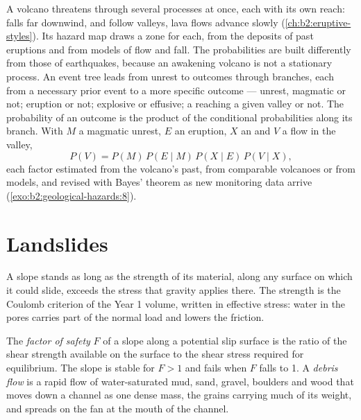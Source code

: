 A volcano threatens through several processes at once, each with its own reach:  falls far
downwind,  and  follow valleys, lava flows advance slowly
(\cref{ch:b2:eruptive-styles}). Its hazard map draws a zone for each, from the deposits of past
eruptions and from models of flow and fall. The probabilities are built differently from those of
earthquakes, because an awakening volcano is not a stationary process. An event tree leads
from unrest to outcomes through branches, each from a necessary prior event to a more specific
outcome --- unrest, magmatic or not; eruption or not; explosive or effusive; a 
reaching a given valley or not. The probability of an outcome is the product of the conditional
probabilities along its branch. With $M$ a magmatic unrest, $E$ an eruption, $X$ an  and $V$ a flow in the valley,
\begin{equation*}
P(V) = P(M) \, P(E \mid M) \, P(X \mid E) \, P(V \mid X),
\end{equation*}
each factor estimated from the volcano's past, from comparable volcanoes or from models, and revised with
Bayes' theorem as new monitoring data arrive (\cref{exo:b2:geological-hazards:8}).

\section{Landslides}\label{sec:b2:geological-hazards:landslides}

A slope stands as long as the strength of its material, along any surface on which it could slide,
exceeds the stress that gravity applies there. The strength is the Coulomb criterion of the Year 1
volume, written in effective stress: water in the pores carries part of the normal load and
lowers the friction.

\begin{definition}\label{def:b2:geological-hazards:slope}
The \emph{factor of safety} $F$ of a slope along a potential slip surface
is the ratio of the shear strength available on the surface to the shear stress required for
equilibrium. The slope is stable for $F > 1$ and fails when $F$ falls to 1. A \emph{debris
flow} is a rapid flow of water-saturated mud, sand, gravel, boulders and wood
that moves down a channel as one dense mass, the grains carrying much of its weight, and spreads
on the fan at the mouth of the channel.
\end{definition}

